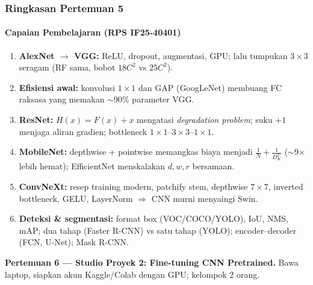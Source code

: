 \documentclass[t,aspectratio=169,xcolor=dvipsnames]{beamer}
\begin{document}
\begin{frame}
    \frametitle{Ringkasan Pertemuan 5}
    \framesubtitle{Capaian Pembelajaran (RPS IF25-40401)}
    \footnotesize

    \begin{enumerate}
        \item \textbf{AlexNet $\to$ VGG:} ReLU, dropout, augmentasi, GPU; lalu tumpukan $3\times3$ seragam (RF sama, bobot $18C^2$ vs $25C^2$).
        \item \textbf{Efisiensi awal:} konvolusi $1\times1$ dan GAP (GoogLeNet) membuang FC raksasa yang memakan $\sim$90\% parameter VGG.
        \item \textbf{ResNet:} $H(x)=F(x)+x$ mengatasi \textit{degradation problem}; suku $+1$ menjaga aliran gradien; bottleneck $1\times1$--$3\times3$--$1\times1$.
        \item \textbf{MobileNet:} depthwise + pointwise memangkas biaya menjadi $\tfrac1N+\tfrac1{D_K^2}$ ($\sim$9$\times$ lebih hemat); EfficientNet menskalakan $d, w, r$ bersamaan.
        \item \textbf{ConvNeXt:} resep training modern, patchify stem, depthwise $7\times7$, inverted bottleneck, GELU, LayerNorm $\Rightarrow$ CNN murni menyaingi Swin.
        \item \textbf{Deteksi \& segmentasi:} format box (VOC/COCO/YOLO), IoU, NMS, mAP; dua tahap (Faster R-CNN) vs satu tahap (YOLO); encoder--decoder (FCN, U-Net); Mask R-CNN.
    \end{enumerate}

    \vspace{0.1cm}
    {\scriptsize\color{dlMute}\textbf{Pertemuan 6 --- Studio Proyek 2: Fine-tuning CNN Pretrained.} Bawa laptop, siapkan akun Kaggle/Colab dengan GPU; kelompok 2 orang.}
\end{frame}
\end{document}
